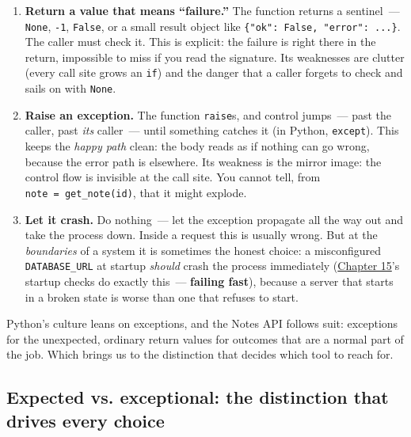 \begin{enumerate}
\def\labelenumi{\arabic{enumi}.}
\item
  \textbf{Return a value that means ``failure.''} The function returns a sentinel~--- \texttt{None}, \texttt{-1}, \texttt{False}, or a small result object like \texttt{\{"ok":}\allowbreak{}\texttt{\ False,}\allowbreak{}\texttt{\ "error":}\allowbreak{}\texttt{\ .}\allowbreak{}\texttt{.}\allowbreak{}\texttt{.}\allowbreak{}\texttt{\}}. The caller must check it. This is explicit: the failure is right there in the return, impossible to miss if you read the signature. Its weaknesses are clutter (every call site grows an \texttt{if}) and the danger that a caller forgets to check and sails on with \texttt{None}.
\item
  \textbf{Raise an exception.} The function \texttt{raise}s, and control jumps~--- past the caller, past \emph{its} caller~--- until something catches it (in Python, \texttt{except}). This keeps the \emph{happy path} clean: the body reads as if nothing can go wrong, because the error path is elsewhere. Its weakness is the mirror image: the control flow is invisible at the call site. You cannot tell, from \texttt{note\ =}\allowbreak{}\texttt{\ get\_note(id)}, that it might explode.
\item
  \textbf{Let it crash.} Do nothing~--- let the exception propagate all the way out and take the process down. Inside a request this is usually wrong. But at the \emph{boundaries} of a system it is sometimes the honest choice: a misconfigured \texttt{DATABASE\_URL} at startup \emph{should} crash the process immediately (\hyperref[ch:15-structuring-the-application]{Chapter 15}'s startup checks do exactly this~--- \textbf{failing fast}), because a server that starts in a broken state is worse than one that refuses to start.
\end{enumerate}

\noindent{}Python's culture leans on exceptions, and the Notes API follows suit: exceptions for the unexpected, ordinary return values for outcomes that are a normal part of the job. Which brings us to the distinction that decides which tool to reach for.

\subsection*{Expected vs. exceptional: the distinction that drives every choice}\label{16-logging-error-handling:expected-vs-exceptional-the-distinction-that-drives-every-choice}

